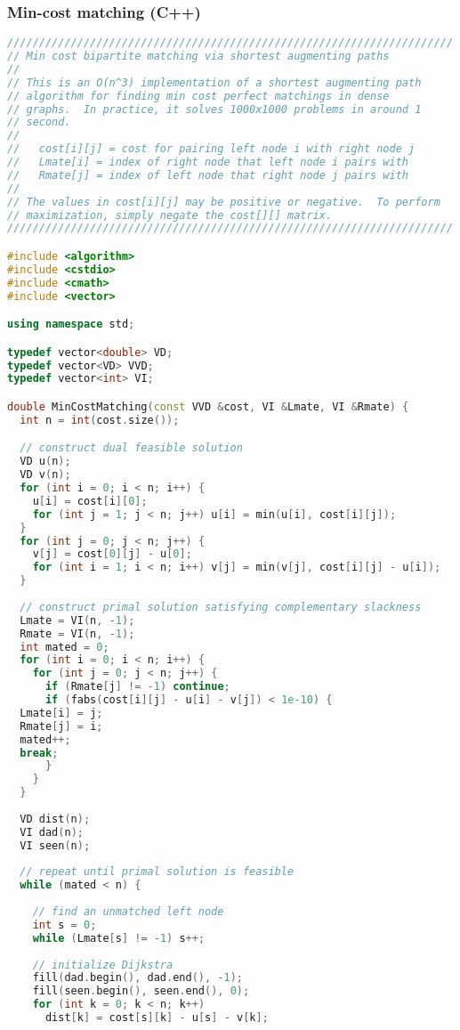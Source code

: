 \subsubsection{Min-cost matching (C++)}
\begin{lstlisting}[language=C++]
//////////////////////////////////////////////////////////////////////
// Min cost bipartite matching via shortest augmenting paths
//
// This is an O(n^3) implementation of a shortest augmenting path
// algorithm for finding min cost perfect matchings in dense
// graphs.  In practice, it solves 1000x1000 problems in around 1
// second.
//
//   cost[i][j] = cost for pairing left node i with right node j
//   Lmate[i] = index of right node that left node i pairs with
//   Rmate[j] = index of left node that right node j pairs with
//
// The values in cost[i][j] may be positive or negative.  To perform
// maximization, simply negate the cost[][] matrix.
//////////////////////////////////////////////////////////////////////

#include <algorithm>
#include <cstdio>
#include <cmath>
#include <vector>

using namespace std;

typedef vector<double> VD;
typedef vector<VD> VVD;
typedef vector<int> VI;

double MinCostMatching(const VVD &cost, VI &Lmate, VI &Rmate) {
  int n = int(cost.size());

  // construct dual feasible solution
  VD u(n);
  VD v(n);
  for (int i = 0; i < n; i++) {
    u[i] = cost[i][0];
    for (int j = 1; j < n; j++) u[i] = min(u[i], cost[i][j]);
  }
  for (int j = 0; j < n; j++) {
    v[j] = cost[0][j] - u[0];
    for (int i = 1; i < n; i++) v[j] = min(v[j], cost[i][j] - u[i]);
  }
  
  // construct primal solution satisfying complementary slackness
  Lmate = VI(n, -1);
  Rmate = VI(n, -1);
  int mated = 0;
  for (int i = 0; i < n; i++) {
    for (int j = 0; j < n; j++) {
      if (Rmate[j] != -1) continue;
      if (fabs(cost[i][j] - u[i] - v[j]) < 1e-10) {
  Lmate[i] = j;
  Rmate[j] = i;
  mated++;
  break;
      }
    }
  }
  
  VD dist(n);
  VI dad(n);
  VI seen(n);
  
  // repeat until primal solution is feasible
  while (mated < n) {
    
    // find an unmatched left node
    int s = 0;
    while (Lmate[s] != -1) s++;
    
    // initialize Dijkstra
    fill(dad.begin(), dad.end(), -1);
    fill(seen.begin(), seen.end(), 0);
    for (int k = 0; k < n; k++) 
      dist[k] = cost[s][k] - u[s] - v[k];
    

\end{lstlisting}

